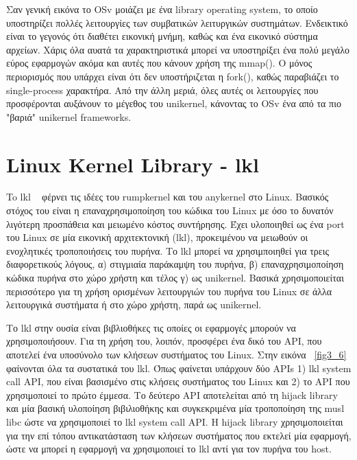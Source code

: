 Σαν γενική εικόνα το OSv μοιάζει με ένα library operating system, το οποίο
υποστηρίζει πολλές λειτουργίες των συμβατικών λειτυργικών συστημάτων. Ενδεικτικό
είναι το γεγονός ότι διαθέτει εικονική μνήμη, καθώς και ένα εικονικό σύστημα
αρχείων. Χάρις όλα αυατά τα χαρακτηριστικά μπορεί να υποστηρίξει ένα πολύ μεγάλο
εύρος εφαρμογών ακόμα και αυτές που κάνουν χρήση της mmap(). Ο μόνος περιορισμός
που υπάρχει είναι ότι δεν υποστήριζεται η fork(), καθώς παραβιάζει το
single-process χαρακτήρα. Από την άλλη μεριά, όλες αυτές οι λειτουργίες που
προσφέρονται αυξάνουν το μέγεθος του unikernel, κάνοντας το OSv ένα από τα πιο
"βαριά" unikernel frameworks. 


\section{Linux Kernel Library - lkl}
To lkl ~\cite{purdila2010lkl} φέρνει τις ιδέες του rumpkernel και του anykernel
στο Linux. Βασικός στόχος του είναι η επαναχρησιμοποίηση του κώδικα του Linux με
όσο το δυνατόν λιγότερη προσπάθεια και μειωμένο κόστος συντήρησης. Έχει
υλοποιηθεί ως ένα port του Linux σε μία εικονική αρχιτεκτονική (lkl),
προκειμένου να μειωθούν οι ενοχλητικές τροποποιήσεις του πυρήνα. Το lkl μπορεί
να χρησιμποιηθεί για τρεις διαφορετικούς λόγους, α) στιγμιαία παράκαμψη του
πυρήνα, β) επαναχρησιμοποίηση κώδικα πυρήνα στο χώρο χρήστη και τέλος γ) ως
unikernel. Βασικά χρησιμοποιείται περισσότερο για τη χρήση ορισμένων
λειτουργιών του πυρήνα του Linux σε άλλα λειτουργικά συστήματα ή στο χώρο
χρήστη, παρά ως unikernel.

Το lkl στην ουσία είναι βιβλιοθήκες τις οποίες οι εφαρμογές μπορούν να
χρησιμοποιήσουν. Για τη χρήση του, λοιπόν, προσφέρει ένα δικό του ΑΡΙ, που
αποτελεί ένα υποσύνολο των κλήσεων συστήματος του Linux. Στην εικόνα
~\ref{fig3_6} φαίνονται όλα τα συστατικά του lkl. Όπως φαίνεται υπάρχουν δύο
APIs 1) lkl system call API, που είναι βασισμένο στις κλήσεις συστήματος του
Linux  και 2) το API που χρησιμοποιεί το πρώτο έμμεσα. Το δεύτερο API
αποτελείται από τη hijack library και μία βασική υλοποίηση βιβιλιοθήκης και
συγκεκριμένα μία τροποποίηση της musl libc ώστε να χρησιμοποιεί το lkl system
call API. H hijack library χρησιμοποιείται για την επί τόπου αντικατάσταση των
κλήσεων συστήματος που εκτελεί μία εφαρμογή, ώστε να μπορεί η εφαρμογή να
χρησιμοποιεί το lkl αντί για τον πυρήνα του host. 

